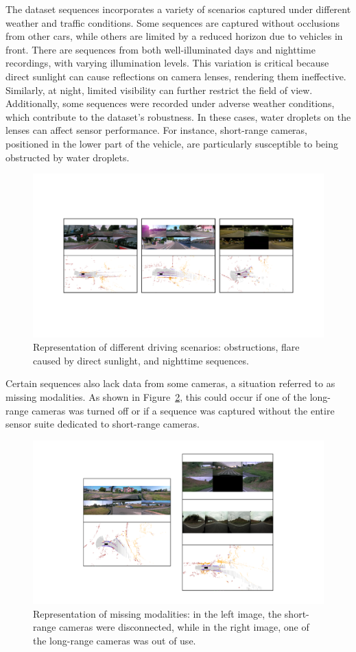 The dataset sequences incorporates a variety of scenarios captured under different weather and traffic conditions. Some sequences are captured without occlusions from other cars, while others are limited by a reduced horizon due to vehicles in front. There are sequences from both well-illuminated days and nighttime recordings, with varying illumination levels. This variation is critical because direct sunlight can cause reflections on camera lenses, rendering them ineffective. Similarly, at night, limited visibility can further restrict the field of view. Additionally, some sequences were recorded under adverse weather conditions, which contribute to the dataset’s robustness. In these cases, water droplets on the lenses can affect sensor performance. For instance, short-range cameras, positioned in the lower part of the vehicle, are particularly susceptible to being obstructed by water droplets.
\begin{figure}[H]
    \centering
    \includegraphics[width=1\linewidth]{LateX//figs/scenarios.pdf}
    \caption{Representation of different driving scenarios: obstructions, flare caused by direct sunlight, and nighttime sequences.}
    \label{fig:scenarios}
\end{figure}

Certain sequences also lack data from some cameras, a situation referred to as missing modalities. As shown in Figure~\ref{fig:missing_modalities}, this could occur if one of the long-range cameras was turned off or if a sequence was captured without the entire sensor suite dedicated to short-range cameras.
\begin{figure}[H]
    \centering
    \includegraphics[width=0.6\linewidth]{LateX//figs/missing_modalities.pdf}
    \caption{Representation of missing modalities: in the left image, the short-range cameras were disconnected, while in the right image, one of the long-range cameras was out of use.}
    \label{fig:missing_modalities}
\end{figure}

